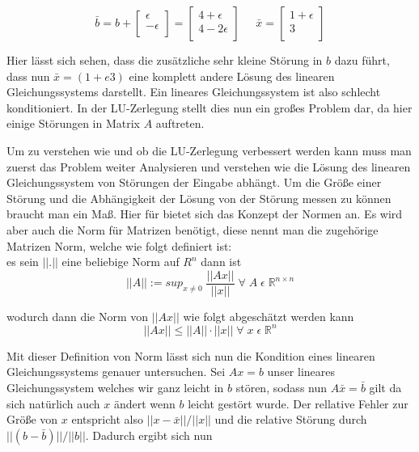 \documentclass[course=erap]{aspdoc}
\begin{document}
\begin{equation}
\label{absBeis2}
\bar{b} = b + 
 \begin{bmatrix}
 \epsilon \\
 -\epsilon\\
 \end{bmatrix}
 = \begin{bmatrix}
 4 + \epsilon\\
 4- 2\epsilon\\
 \end{bmatrix}
  \;\;\;\;\;
  \bar{x} = 
  \begin{bmatrix}
 1 + \epsilon \\
 3\\
\end{bmatrix}
\end{equation}

Hier lässt sich sehen, dass die zusätzliche sehr kleine Störung in $b$ dazu führt, 
dass nun $\bar{x} = ( 1+e 3)$ eine komplett andere Lösung des linearen Gleichungssystems darstellt.
Ein lineares Gleichungssystem ist also schlecht konditioniert. In der LU-Zerlegung stellt dies nun ein großes 
Problem dar, da hier einige Störungen in Matrix $A$ auftreten.

Um zu verstehen wie und ob die LU-Zerlegung verbessert werden kann muss man 
zuerst das Problem weiter Analysieren und verstehen wie die Lösung des linearen 
Gleichungssystem von Störungen der Eingabe abhängt. 
Um die Größe einer Störung und die Abhängigkeit der Lösung von der Störung messen zu 
können braucht man ein Maß. Hier für bietet sich das Konzept der Normen an. Es wird aber 
auch die Norm für Matrizen benötigt, diese nennt man die zugehörige Matrizen Norm, 
welche wie folgt definiert ist: \\

es sein $||.||$ eine beliebige Norm auf $R^n$ dann ist  
\begin{equation}
\label{norm}
||A|| := sup_{x\neq 0}\;\frac{||Ax||}{||x||}\; \forall\; A \;\epsilon \;\mathbb{R}^{n \times n}
\end{equation}

wodurch dann die Norm von $||Ax||$ wie folgt abgeschätzt werden kann
 \begin{equation}
\label{norm}
||Ax|| \leq ||A|| \cdot ||x||\;  \forall\; x \;\epsilon \;\mathbb{R}^n 
\end{equation}

Mit dieser Definition von Norm lässt sich nun die Kondition eines linearen 
Gleichungssystems genauer untersuchen. Sei $Ax=b$ unser lineares Gleichungssystem 
welches wir ganz leicht in $b$ stören, sodass nun $A \bar{x}=\bar{b}$ gilt da sich natürlich auch $x $
ändert wenn $b$ leicht gestört wurde. 
Der rellative Fehler zur Größe von $x$ entspricht also 
 $||x-\bar{x}|| / ||x||$ und die relative Störung durch 
$||(b-\bar{b})|| / ||b||$. Dadurch ergibt sich nun 
\end{document}
